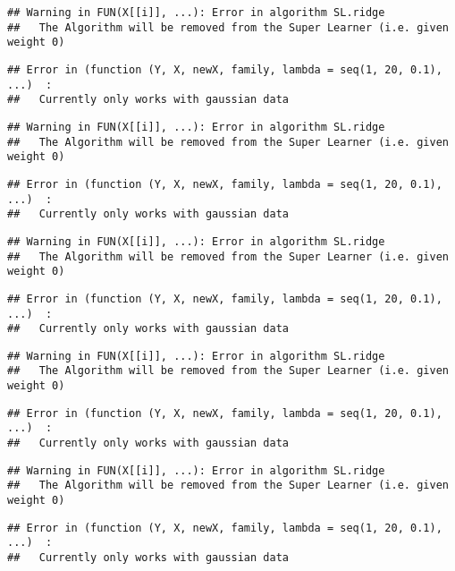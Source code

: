 \documentclass[
]{article}
\begin{document}
\begin{verbatim}
## Warning in FUN(X[[i]], ...): Error in algorithm SL.ridge 
##   The Algorithm will be removed from the Super Learner (i.e. given weight 0)
\end{verbatim}

\begin{verbatim}
## Error in (function (Y, X, newX, family, lambda = seq(1, 20, 0.1), ...)  : 
##   Currently only works with gaussian data
\end{verbatim}

\begin{verbatim}
## Warning in FUN(X[[i]], ...): Error in algorithm SL.ridge 
##   The Algorithm will be removed from the Super Learner (i.e. given weight 0)
\end{verbatim}

\begin{verbatim}
## Error in (function (Y, X, newX, family, lambda = seq(1, 20, 0.1), ...)  : 
##   Currently only works with gaussian data
\end{verbatim}

\begin{verbatim}
## Warning in FUN(X[[i]], ...): Error in algorithm SL.ridge 
##   The Algorithm will be removed from the Super Learner (i.e. given weight 0)
\end{verbatim}

\begin{verbatim}
## Error in (function (Y, X, newX, family, lambda = seq(1, 20, 0.1), ...)  : 
##   Currently only works with gaussian data
\end{verbatim}

\begin{verbatim}
## Warning in FUN(X[[i]], ...): Error in algorithm SL.ridge 
##   The Algorithm will be removed from the Super Learner (i.e. given weight 0)
\end{verbatim}

\begin{verbatim}
## Error in (function (Y, X, newX, family, lambda = seq(1, 20, 0.1), ...)  : 
##   Currently only works with gaussian data
\end{verbatim}

\begin{verbatim}
## Warning in FUN(X[[i]], ...): Error in algorithm SL.ridge 
##   The Algorithm will be removed from the Super Learner (i.e. given weight 0)
\end{verbatim}

\begin{verbatim}
## Error in (function (Y, X, newX, family, lambda = seq(1, 20, 0.1), ...)  : 
##   Currently only works with gaussian data
\end{verbatim}
\end{document}
